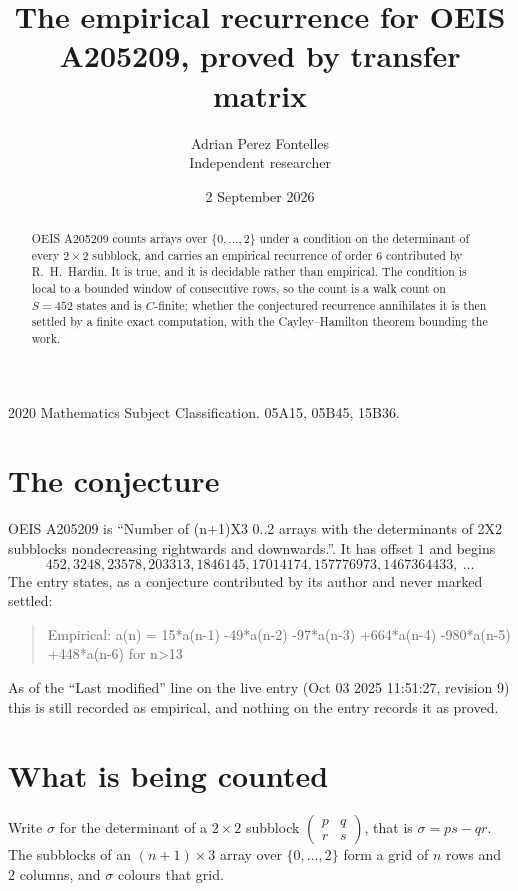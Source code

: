\documentclass[11pt,a4paper]{article}
\title{The empirical recurrence for OEIS A205209, proved by transfer matrix}
\author{Adrian Perez Fontelles\\ \small Independent researcher}
\date{2 September 2026}
\theoremstyle{plain}
\theoremstyle{definition}
\begin{document}
\maketitle

\begin{abstract}
OEIS A205209 counts arrays over $\{0,\dots,2\}$ under a condition on the determinant of every
$2\times2$ subblock, and carries an empirical recurrence of order $6$ contributed by
R.~H.~Hardin. It is true, and it is decidable rather than empirical. The condition is local to
a bounded window of consecutive rows, so the count is a walk count on $S=452$ states and is
$C$-finite; whether the conjectured recurrence annihilates it is then settled by a finite exact
computation, with the Cayley--Hamilton theorem bounding the work.
\end{abstract}

\noindent\small 2020 Mathematics Subject Classification. 05A15, 05B45, 15B36.\normalsize

\section{The conjecture}

OEIS A205209 is ``Number of (n+1)X3 0..2 arrays with the determinants of 2X2 subblocks nondecreasing rightwards and downwards.''. It has offset $1$ and begins
\[
452, 3248, 23578, 203313, 1846145, 17014174, 157776973, 1467364433,\ \dots
\]
The entry states, as a conjecture contributed by its author and never marked settled:
\begin{quote}
Empirical: a(n) = 15*a(n-1) -49*a(n-2) -97*a(n-3) +664*a(n-4) -980*a(n-5) +448*a(n-6) for n>13
\end{quote}
As of the ``Last modified'' line on the live entry (Oct 03 2025 11:51:27, revision 9) this is still
recorded as empirical, and nothing on the entry records it as proved.

\section{What is being counted}

Write $\sigma$ for the determinant of a $2\times2$ subblock
$\begin{pmatrix}p&q\\r&s\end{pmatrix}$, that is $\sigma=ps-qr$. The subblocks of an
$(n+1)\times3$ array over $\{0,\dots,2\}$ form a grid of $n$ rows and $2$
columns, and $\sigma$ colours that grid.
\end{document}
